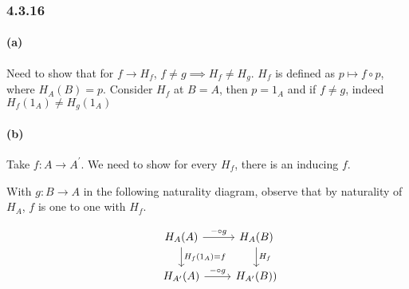 \documentclass{article}
\begin{document}
\subsubsection*{4.3.16}

\paragraph{(a)}

Need to show that for $f \rightarrow H_f$, $f \neq g \implies H_f \neq H_g$. $H_f$ is defined as $p \mapsto f \circ p$, where $H_A(B) = p$. Consider $H_f$ at $B=A$, then $p=1_A$ and if $f \neq g$, indeed $H_f(1_A) \neq H_g(1_A)$

\paragraph{(b)}
Take $f: A \rightarrow A^{\prime}$. We need to show for every $H_f$, there is an inducing $f$.

With $g: B \rightarrow A$ in the following naturality diagram, observe that by naturality of $H_A$, $f$ is one to one with $H_f$.

\begin{equation*}
\begin{tikzcd}
  & H_A(A) \arrow[d,"H_f(1_A) = f"] \arrow[r, "\mathit{-} \circ g"] & H_A(B) \arrow[d,"H_f"] \\
  & H_{A^\prime}(A) \arrow[r,"\mathit{-} \circ g"] & H_{A^\prime}(B))
\end{tikzcd}
\end{equation*}
\end{document}
